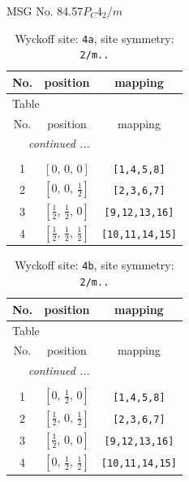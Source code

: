 \documentclass[fleqn,8pt]{jsarticle}
\begin{document}
\setcounter{MaxMatrixCols}{32}

\renewcommand{\tablename}{Table~}
\renewcommand{\figurename}{Figure~}
\begin{center}
\LARGE
MSG No. 84.57\quad$P_{C}4_{2}/m$
\end{center}
\renewcommand{\arraystretch}{1.2}
\begin{longtable}{ccc}
\caption{Wyckoff site: {\tt 4a}, site symmetry: {\tt 2/m..}}
 \\
 \hline \hline
No. & position & mapping \\ \hline \endfirsthead

\multicolumn{2}{l}{\tablename\ \thetable{}} \\
 \hline \hline
No. & position & mapping \\ \hline \endhead

 \hline \hline
\multicolumn{2}{r}{\footnotesize\it continued ...} \\ \endfoot

 \hline \hline
\multicolumn{2}{r}{} \\ \endlastfoot

1 & $\left[ 0,\, 0,\, 0 \right]$ & {\tt [1,4,5,8]} \\ \hline
2 & $\left[ 0,\, 0,\, \frac{1}{2} \right]$ & {\tt [2,3,6,7]} \\ \hline
3 & $\left[ \frac{1}{2},\, \frac{1}{2},\, 0 \right]$ & {\tt [9,12,13,16]} \\ \hline
4 & $\left[ \frac{1}{2},\, \frac{1}{2},\, \frac{1}{2} \right]$ & {\tt [10,11,14,15]} \\
\end{longtable}
\renewcommand{\arraystretch}{1.2}
\begin{longtable}{ccc}
\caption{Wyckoff site: {\tt 4b}, site symmetry: {\tt 2/m..}}
 \\
 \hline \hline
No. & position & mapping \\ \hline \endfirsthead

\multicolumn{2}{l}{\tablename\ \thetable{}} \\
 \hline \hline
No. & position & mapping \\ \hline \endhead

 \hline \hline
\multicolumn{2}{r}{\footnotesize\it continued ...} \\ \endfoot

 \hline \hline
\multicolumn{2}{r}{} \\ \endlastfoot

1 & $\left[ 0,\, \frac{1}{2},\, 0 \right]$ & {\tt [1,4,5,8]} \\ \hline
2 & $\left[ \frac{1}{2},\, 0,\, \frac{1}{2} \right]$ & {\tt [2,3,6,7]} \\ \hline
3 & $\left[ \frac{1}{2},\, 0,\, 0 \right]$ & {\tt [9,12,13,16]} \\ \hline
4 & $\left[ 0,\, \frac{1}{2},\, \frac{1}{2} \right]$ & {\tt [10,11,14,15]} \\
\end{longtable}
\end{document}
